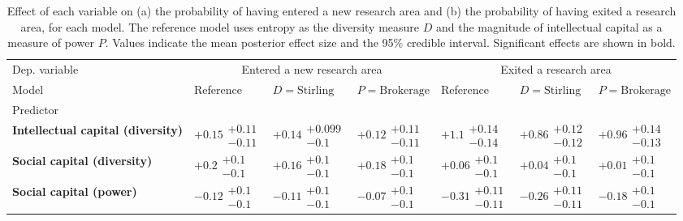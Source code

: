 \begin{table}[H]
\centering
\caption{Effect of each variable on (a) the probability of having entered a new research area and (b) the probability of having exited a research area, for each model. The reference model uses entropy as the diversity measure $D$ and the magnitude of intellectual capital as a measure of power $P$. Values indicate the mean posterior effect size and the 95\% credible interval. Significant effects are shown in bold.}
\label{table:summary_entered_exited}
\renewcommand{\arraystretch}{2}\fontsize{6}{7}\selectfont\begin{tabular}{lllllll}
\toprule
Dep. variable & \multicolumn{3}{c}{Entered a new research area} & \multicolumn{3}{c}{Exited a research area} \\
Model &                              Reference &                    $D=\text{Stirling}$ &                   $P=\text{Brokerage}$ &                              Reference &                    $D=\text{Stirling}$ &                   $P=\text{Brokerage}$ \\
Predictor                                 &                                        &                                        &                                        &                                        &                                        &                                        \\
\midrule
\textbf{Intellectual capital (diversity)} &  $\bm{+0.15}\substack{+0.11 \\ -0.11}$ &  $\bm{+0.14}\substack{+0.099 \\ -0.1}$ &  $\bm{+0.12}\substack{+0.11 \\ -0.11}$ &   $\bm{+1.1}\substack{+0.14 \\ -0.14}$ &  $\bm{+0.86}\substack{+0.12 \\ -0.12}$ &  $\bm{+0.96}\substack{+0.14 \\ -0.13}$ \\
\textbf{Social capital (diversity)}       &     $\bm{+0.2}\substack{+0.1 \\ -0.1}$ &    $\bm{+0.16}\substack{+0.1 \\ -0.1}$ &    $\bm{+0.18}\substack{+0.1 \\ -0.1}$ &         $+0.06\substack{+0.1 \\ -0.1}$ &         $+0.04\substack{+0.1 \\ -0.1}$ &         $+0.01\substack{+0.1 \\ -0.1}$ \\
\textbf{Social capital (power)}           &    $\bm{-0.12}\substack{+0.1 \\ -0.1}$ &    $\bm{-0.11}\substack{+0.1 \\ -0.1}$ &         $-0.07\substack{+0.1 \\ -0.1}$ &  $\bm{-0.31}\substack{+0.11 \\ -0.11}$ &  $\bm{-0.26}\substack{+0.11 \\ -0.11}$ &    $\bm{-0.18}\substack{+0.1 \\ -0.1}$ \\

\end{tabular}
\end{table}
